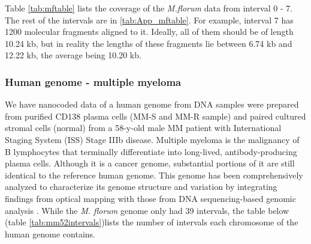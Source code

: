 Table \ref{tab:mftable} lists the coverage of the {\emph{M.florum}} data from interval 0 - 7. The rest of the intervals are in \ref{tab:App_mftable}. For example, interval 7 has 1200 molecular fragments aligned to it. Ideally, all of them should be of length 10.24 kb, but in reality the lengths of these fragments lie between 6.74 kb and 12.22 kb, the average being 10.20 kb. 

\subsubsection{Human genome - multiple myeloma}
We have nanocoded data of a human genome from DNA samples were prepared from purified CD138 plasma cells (MM-S and MM-R sample) and paired cultured stromal cells (normal) from a 58-y-old male MM patient with International Staging System (ISS) Stage IIIb disease. Multiple myeloma is the malignancy of B lymphocytes that terminally differentiate into long-lived, antibody-producing plasma cells. Although it is a cancer genome, substantial portions of it are still identical to the reference human genome. This genome has been comprehensively analyzed to characterize its genome structure and variation by integrating findings from optical mapping with those from DNA sequencing-based genomic analysis \cite{Gupta_etal_2015_PNAS}. While the {\emph{M. florum}} genome only had 39 intervals, the table below (table \ref{tab:mm52intervals})lists the number of intervals each chromosome of the human genome contains.

